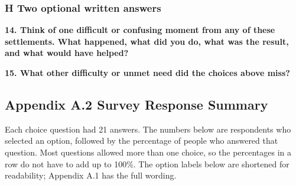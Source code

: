 \subsubsection*{H Two optional written answers}

\par\smallskip\noindent\textbf{14. Think of one difficult or confusing moment from any of these settlements. What happened, what did you do, what was the result, and what would have helped?}\par\nobreak

\par\smallskip\noindent\textbf{15. What other difficulty or unmet need did the choices above miss?}\par\nobreak

\subsection*{Appendix A.2 Survey Response Summary}

Each choice question had 21 answers. The numbers below are respondents who selected an option, followed by the percentage of people who answered that question. Most questions allowed more than one choice, so the percentages in a row do not have to add up to 100\%. The option labels below are shortened for readability; Appendix A.1 has the full wording.

